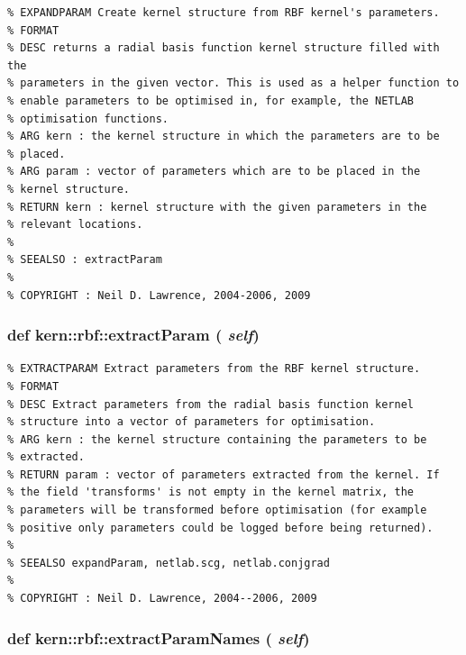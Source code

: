 \footnotesize\begin{verbatim}% EXPANDPARAM Create kernel structure from RBF kernel's parameters.
% FORMAT
% DESC returns a radial basis function kernel structure filled with the
% parameters in the given vector. This is used as a helper function to
% enable parameters to be optimised in, for example, the NETLAB
% optimisation functions.
% ARG kern : the kernel structure in which the parameters are to be
% placed.
% ARG param : vector of parameters which are to be placed in the
% kernel structure.
% RETURN kern : kernel structure with the given parameters in the
% relevant locations.
%
% SEEALSO : extractParam
%
% COPYRIGHT : Neil D. Lawrence, 2004-2006, 2009

\end{verbatim}
\normalsize
 \hypertarget{classkern_1_1rbf_bae71f49c71ee4a2f1c072e5262a8d07}{
\subsubsection[{extractParam}]{\setlength{\rightskip}{0pt plus 5cm}def kern::rbf::extractParam ( {\em self})}}
\label{classkern_1_1rbf_bae71f49c71ee4a2f1c072e5262a8d07}




\footnotesize\begin{verbatim}% EXTRACTPARAM Extract parameters from the RBF kernel structure.
% FORMAT
% DESC Extract parameters from the radial basis function kernel
% structure into a vector of parameters for optimisation.
% ARG kern : the kernel structure containing the parameters to be
% extracted.
% RETURN param : vector of parameters extracted from the kernel. If
% the field 'transforms' is not empty in the kernel matrix, the
% parameters will be transformed before optimisation (for example
% positive only parameters could be logged before being returned).
%
% SEEALSO expandParam, netlab.scg, netlab.conjgrad
%
% COPYRIGHT : Neil D. Lawrence, 2004--2006, 2009

\end{verbatim}
\normalsize
 \hypertarget{classkern_1_1rbf_612d8dca7710da14b51fd06e4cb52de4}{
\subsubsection[{extractParamNames}]{\setlength{\rightskip}{0pt plus 5cm}def kern::rbf::extractParamNames ( {\em self})}}
\label{classkern_1_1rbf_612d8dca7710da14b51fd06e4cb52de4}




